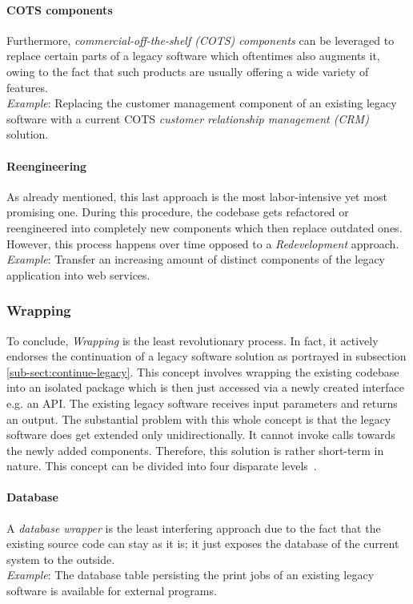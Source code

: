 \documentclass[12pt,a4paper,twoside]{report}
\begin{document}
\paragraph{COTS components}
Furthermore, \textit{commercial-off-the-shelf (COTS) components} can be
leveraged to replace certain parts of a legacy software which oftentimes also
augments it, owing to the fact that such products are usually offering a wide
variety of features.\\
\textit{Example}: Replacing the customer management component of an existing
legacy software with a current COTS \textit{customer relationship management (CRM)} solution.

\paragraph{Reengineering}
As already mentioned, this last approach is the most labor-intensive yet most promising one.
During this procedure, the codebase gets refactored or reengineered
into completely new components which then replace outdated ones.
However, this process happens over time opposed to a \textit{Redevelopment} approach.\\
\textit{Example}: Transfer an increasing amount of distinct components
of the legacy application into web services.


\subsubsection{Wrapping}

To conclude, \textit{Wrapping} is the least revolutionary process.
In fact, it actively endorses the continuation of a legacy software solution as
portrayed in subsection \ref{sub-sect:continue-legacy}.
This concept involves wrapping the existing codebase into an isolated package
which is then just accessed via a newly created interface e.g. an API.
The existing legacy software receives input parameters and returns an output.
The substantial problem with this whole concept is that the legacy software does get
extended only unidirectionally. It cannot invoke calls towards the newly added components.
Therefore, this solution is rather short-term in nature.
This concept can be divided into four disparate levels~\cite{sneed-encapsulating-legacy}.

\paragraph{Database}
A \textit{database wrapper} is the least interfering approach due to the fact that
the existing source code can stay as it is; it just exposes the database of the current system
to the outside.\\
\textit{Example}: The database table persisting the print jobs of an existing legacy software
is available for external programs.
\end{document}
